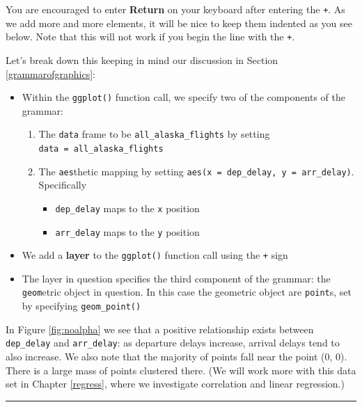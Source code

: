 \documentclass[]{tufte-book}
\let\oldrule=\rule
\renewcommand{\rule}[1]{\oldrule{\linewidth}}
\providecommand{\tightlist}{%
  \setlength{\itemsep}{0pt}\setlength{\parskip}{0pt}}
\begin{document}
You are encouraged to enter \textbf{Return} on your keyboard after
entering the \texttt{+}. As we add more and more elements, it will be
nice to keep them indented as you see below. Note that this will not
work if you begin the line with the \texttt{+}.

Let's break down this keeping in mind our discussion in Section
\ref{grammarofgraphics}:

\begin{itemize}
\tightlist
\item
  Within the \texttt{ggplot()} function call, we specify two of the
  components of the grammar:

  \begin{enumerate}
  \def\labelenumi{\arabic{enumi}.}
  \tightlist
  \item
    The \texttt{data} frame to be \texttt{all\_alaska\_flights} by
    setting \texttt{data\ =\ all\_alaska\_flights}
  \item
    The \texttt{aes}thetic mapping by setting
    \texttt{aes(x\ =\ dep\_delay,\ y\ =\ arr\_delay)}. Specifically

    \begin{itemize}
    \tightlist
    \item
      \texttt{dep\_delay} maps to the \texttt{x} position
    \item
      \texttt{arr\_delay} maps to the \texttt{y} position
    \end{itemize}
  \end{enumerate}
\item
  We add a \textbf{layer} to the \texttt{ggplot()} function call using
  the \texttt{+} sign
\item
  The layer in question specifies the third component of the grammar:
  the \texttt{geom}etric object in question. In this case the geometric
  object are \texttt{point}s, set by specifying \texttt{geom\_point()}
\end{itemize}

In Figure \ref{fig:noalpha} we see that a positive relationship exists
between \texttt{dep\_delay} and \texttt{arr\_delay}: as departure delays
increase, arrival delays tend to also increase. We also note that the
majority of points fall near the point (0, 0). There is a large mass of
points clustered there. (We will work more with this data set in Chapter
\ref{regress}, where we investigate correlation and linear regression.)

\begin{center}\rule{0.5\linewidth}{\linethickness}\end{center}
\end{document}
